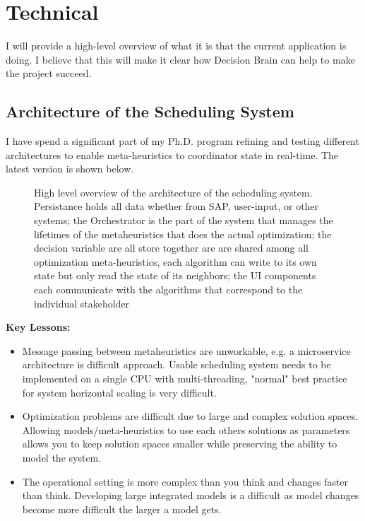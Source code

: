 \newpage
\section*{Technical}
\label{sec:technical}

I will provide a high-level overview of what it is that the current application is doing. I believe that 
this will make it clear how Decision Brain can help to make the project succeed.


\subsection*{Architecture of the Scheduling System}
I have spend a significant part of my Ph.D. program refining and testing different architectures to enable
meta-heuristics to coordinator state in real-time. The latest version is shown below.

\begin{figure}[H]
	\centering
	

	\caption{
		High level overview of the architecture of the scheduling system. Persistance holds
		all data whether from SAP, user-input, or other systems; the Orchestrator is the part of the 
		system that manages the lifetimes of the metaheuristics that does the actual optimization;
		the decision variable are all store together are are shared among all optimization meta-heuristics, 
		each algorithm can write to its own state but only read the state of its neighbors; the UI components
		each communicate with the algorithms that correspond to the individual stakeholder
	}

\end{figure}

\textbf{Key Lessons:}
\begin{itemize}
	\item Message passing between metaheuristics are unworkable, e.g. a microservice architecture is difficult approach. Usable scheduling
	      system needs to be implemented on a single CPU with multi-threading, "normal" best practice for system horizontal scaling is very difficult. 
	\item Optimization problems are difficult due to large and complex solution spaces. Allowing models/meta-heuristics
			  to use each others solutions as parameters allows you to keep solution spaces smaller while preserving the 
		  ability to model the system. 
	\item The operational setting is more complex than you think and changes faster than think. Developing large integrated models 
		  is a difficult as model changes become more difficult the larger a model gets.
\end{itemize}

